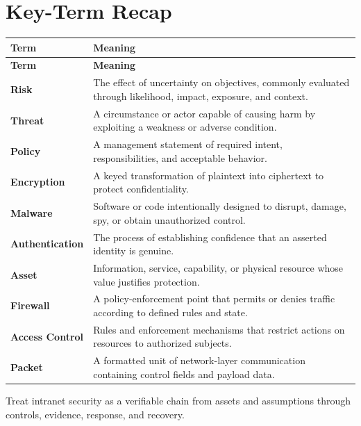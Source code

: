 \documentclass[11pt]{article}
\begin{document}
\section*{Key-Term Recap}
\begin{longtable}{>{\RaggedRight\arraybackslash}p{}>{\RaggedRight\arraybackslash}p{}}
\toprule\rowcolor{Navy}\color{white}\textbf{Term} & \color{white}\textbf{Meaning}\\\midrule
\endfirsthead
\toprule\rowcolor{Navy}\color{white}\textbf{Term} & \color{white}\textbf{Meaning}\\\midrule
\endhead
\textbf{Risk} & The effect of uncertainty on objectives, commonly evaluated through likelihood, impact, exposure, and context. \\\midrule
\textbf{Threat} & A circumstance or actor capable of causing harm by exploiting a weakness or adverse condition. \\\midrule
\textbf{Policy} & A management statement of required intent, responsibilities, and acceptable behavior. \\\midrule
\textbf{Encryption} & A keyed transformation of plaintext into ciphertext to protect confidentiality. \\\midrule
\textbf{Malware} & Software or code intentionally designed to disrupt, damage, spy, or obtain unauthorized control. \\\midrule
\textbf{Authentication} & The process of establishing confidence that an asserted identity is genuine. \\\midrule
\textbf{Asset} & Information, service, capability, or physical resource whose value justifies protection. \\\midrule
\textbf{Firewall} & A policy-enforcement point that permits or denies traffic according to defined rules and state. \\\midrule
\textbf{Access Control} & Rules and enforcement mechanisms that restrict actions on resources to authorized subjects. \\\midrule
\textbf{Packet} & A formatted unit of network-layer communication containing control fields and payload data. \\\midrule
\bottomrule
\end{longtable}
\begin{takeawaybox}
Treat intranet security as a verifiable chain from assets and assumptions through controls, evidence, response, and recovery.
\end{takeawaybox}
\end{document}
